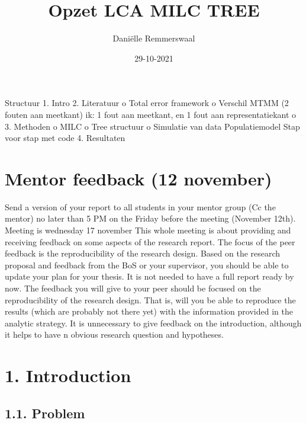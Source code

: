 \documentclass[
]{article}
\title{Opzet LCA MILC TREE}
\author{Daniëlle Remmerswaal}
\date{29-10-2021}
\begin{document}
\maketitle

Structuur 1. Intro 2. Literatuur o Total error framework o Verschil MTMM
(2 fouten aan meetkant) ik: 1 fout aan meetkant, en 1 fout aan
representatiekant o 3. Methoden o MILC o Tree structuur o Simulatie van
data Populatiemodel Stap voor stap met code 4. Resultaten

\hypertarget{mentor-feedback-12-november}{%
\section{Mentor feedback (12
november)}\label{mentor-feedback-12-november}}

Send a version of your report to all students in your mentor group (Cc
the mentor) no later than 5 PM on the Friday before the meeting
(November 12th). Meeting is wednesday 17 november This whole meeting is
about providing and receiving feedback on some aspects of the research
report. The focus of the peer feedback is the reproducibility of the
research design. Based on the research proposal and feedback from the
BoS or your supervisor, you should be able to update your plan for your
thesis. It is not needed to have a full report ready by now. The
feedback you will give to your peer should be focused on the
reproducibility of the research design. That is, will you be able to
reproduce the results (which are probably not there yet) with the
information provided in the analytic strategy. It is unnecessary to give
feedback on the introduction, although it helps to have n obvious
research question and hypotheses.

\hypertarget{introduction}{%
\section{1. Introduction}\label{introduction}}

\hypertarget{problem}{%
\subsection{1.1. Problem}\label{problem}}
\end{document}
